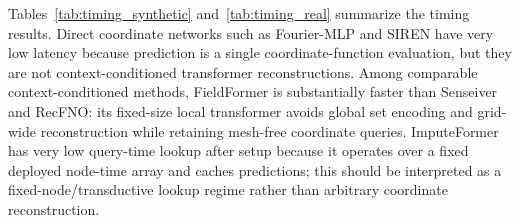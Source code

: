 Tables~\ref{tab:timing_synthetic} and~\ref{tab:timing_real} summarize the timing results. Direct coordinate networks such as Fourier-MLP and SIREN have very low latency because prediction is a single coordinate-function evaluation, but they are not context-conditioned transformer reconstructions. Among comparable context-conditioned methods, FieldFormer is substantially faster than Senseiver and RecFNO: its fixed-size local transformer avoids global set encoding and grid-wide reconstruction while retaining mesh-free coordinate queries. ImputeFormer has very low query-time lookup after setup because it operates over a fixed deployed node-time array and caches predictions; this should be interpreted as a fixed-node/transductive lookup regime rather than arbitrary coordinate reconstruction.

\begin{table}[htbp]
\centering
\caption{Inference timing on synthetic PDE benchmarks. Times are measured on sparse-test prediction using trained checkpoints. The ms/query column excludes model loading and adapter setup; setup time is reported separately. Peak memory is measured during the timed prediction pass.}
\label{tab:timing_synthetic}
\end{table}
